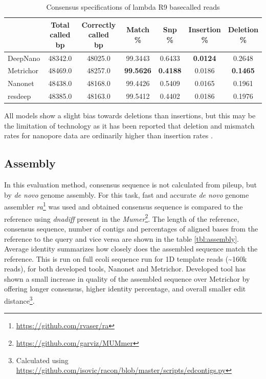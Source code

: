 \documentclass[times, utf8, diplomski, numeric, english]{fer}
\begin{document}
\begin{table}[htb]
	\caption{Consensus specifications of lambda R9 basecalled reads}
	\label{tbl:spec_lambda}
	\centering
	
	\begin{tabular}{lcccccc}
		\toprule
		{} &  \thead{Total called\\\lbrack bp\rbrack} &  \thead{Correctly called\\\lbrack bp\rbrack} &  \thead{Match\\\%} &  \thead{Snp\\\%} &  \thead{Insertion\\\%} &  \thead{Deletion\\\%} \\
		\midrule
		DeepNano  &                    48342.0 &                        48025.0 &          99.3443 &         0.6433 &               \textbf{0.0124} &              0.2648 \\
		Metrichor &                    48469.0 &                        48257.0 &          \textbf{99.5626} &         \textbf{0.4188} &               0.0186 &              \textbf{0.1465} \\
		Nanonet   &                    48438.0 &                        48168.0 &          99.4426 &         0.5409 &               0.0165 &              0.1961 \\
		resdeep   &                    48385.0 &                        48163.0 &          99.5412 &         0.4402 &               0.0186 &              0.1976 \\
		\bottomrule
	\end{tabular}
\end{table}

All models show a slight bias towards deletions than insertions, but this may be the limitation of technology as it has been reported that deletion and mismatch rates for nanopore data are ordinarily higher than insertion rates \cite{sovic}.

\subsection{Assembly}
In this evaluation method, consensus sequence is not calculated from pileup, but by \textit{de novo} genome assembly. For this task, fast and accurate \textit{de novo} genome assembler \textit{ra}\footnote{\url{https://github.com/rvaser/ra}} \cite{vaser} was used and obtained consensus sequence is compared to the reference using \textit{dnadiff} present in the \textit{Mumer}\footnote{\url{https://github.com/garviz/MUMmer}}. 
The length of the reference, consensus sequence, number of contigs and percentages of aligned bases from the reference to the query and vice versa are shown in the table \ref{tbl:assembly}. Average identity summarizes how closely does the assembled sequence match the reference. This is run on full ecoli sequence run for 1D template reads (\textasciitilde 160k reads), for both developed tools, Nanonet and Metrichor. Developed tool has shown a small increase in quality of the assembled sequence over Metrichor by offering longer consensus, higher identity percentage, and overall smaller edit distance\footnote{Calculated using \url{https://github.com/isovic/racon/blob/master/scripts/edcontigs.py}}.
\end{document}
